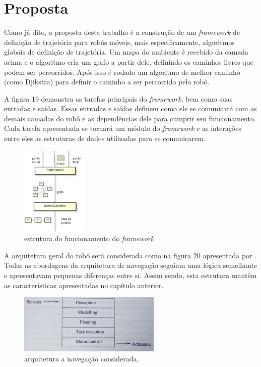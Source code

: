 \chapter[Proposta]{Proposta}

Como já dito, a proposta deste trabalho é a construção de um \textit{framework} de definição de trajetória para robôs móveis, mais especificamente, algoritmos globais de definição de trajetória. Um mapa do ambiente é recebido da camada acima e o algoritmo cria um grafo a partir dele, definindo os caminhos livres que podem ser percorridos. Após isso é rodado um algoritmo de melhor caminho (como Djikstra) para definir o caminho a ser percorrido pelo robô. 

A figura 19 demonstra as tarefas principais do \textit{framework}, bem como suas entradas e saídas. Essas entradas e saídas definem como ele se comunicará com as demais camadas do robô e as dependências dele para cumprir seu funcionamento. Cada tarefa apresentada se tornará um módulo do \textit{framework} e as interações entre eles as estruturas de dados utilizadas para se comunicarem.
 
\begin{figure}[h]
	\centering
	\label{fig19}
		\includegraphics[keepaspectratio=true,scale=1]{figuras/framework.png}
	\caption{estrutura do funcionamento do \textit{framework}}
\end{figure} 

A arquitetura geral do robô será considerada como na figura 20 apresentada por \cite{Nehmzow2003}. Todas as abordagens da arquitetura de navegação seguiam uma lógica semelhante e apresentavam pequenas diferenças entre si. Assim sendo, esta estrutura mantêm as características apresentadas no capítulo anterior.

\begin{figure}[h]
	\centering
	\label{fig20}
		\includegraphics[keepaspectratio=true,scale=1]{figuras/arqusada.jpg}
	\caption{arquitetura a navegação considerada, \cite{Nehmzow2003}}
\end{figure}

